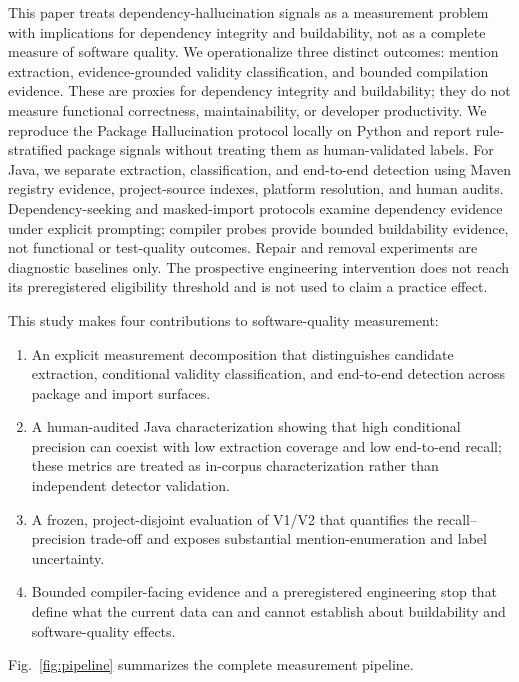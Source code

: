 \documentclass[pdflatex,sn-basic]{sn-jnl}
\begin{document}
This paper treats dependency-hallucination signals as a measurement problem with implications for dependency integrity and buildability, not as a complete measure of software quality. We operationalize three distinct outcomes: mention extraction, evidence-grounded validity classification, and bounded compilation evidence. These are proxies for dependency integrity and buildability; they do not measure functional correctness, maintainability, or developer productivity. We reproduce the Package Hallucination protocol locally on Python and report rule-stratified package signals without treating them as human-validated labels. For Java, we separate extraction, classification, and end-to-end detection using Maven registry evidence, project-source indexes, platform resolution, and human audits. Dependency-seeking and masked-import protocols examine dependency evidence under explicit prompting; compiler probes provide bounded buildability evidence, not functional or test-quality outcomes. Repair and removal experiments are diagnostic baselines only. The prospective engineering intervention does not reach its preregistered eligibility threshold and is not used to claim a practice effect.

This study makes four contributions to software-quality measurement:

\begin{enumerate}
  \item An explicit measurement decomposition that distinguishes candidate extraction, conditional validity classification, and end-to-end detection across package and import surfaces.
  \item A human-audited Java characterization showing that high conditional precision can coexist with low extraction coverage and low end-to-end recall; these metrics are treated as in-corpus characterization rather than independent detector validation.
  \item A frozen, project-disjoint evaluation of V1/V2 that quantifies the recall--precision trade-off and exposes substantial mention-enumeration and label uncertainty.
  \item Bounded compiler-facing evidence and a preregistered engineering stop that define what the current data can and cannot establish about buildability and software-quality effects.
\end{enumerate}

Fig.~\ref{fig:pipeline} summarizes the complete measurement pipeline.
\end{document}
